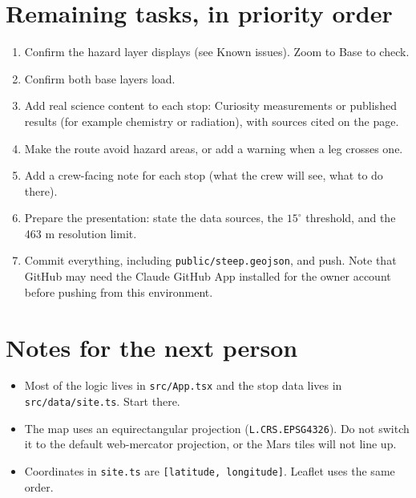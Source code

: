 \documentclass[11pt]{article}
\begin{document}
\section{Remaining tasks, in priority order}
\begin{enumerate}[leftmargin=*]
  \item Confirm the hazard layer displays (see Known issues). Zoom to Base to check.
  \item Confirm both base layers load.
  \item Add real science content to each stop: Curiosity measurements or published results (for example chemistry or radiation), with sources cited on the page.
  \item Make the route avoid hazard areas, or add a warning when a leg crosses one.
  \item Add a crew-facing note for each stop (what the crew will see, what to do there).
  \item Prepare the presentation: state the data sources, the $15^\circ$ threshold, and the 463 m resolution limit.
  \item Commit everything, including \texttt{public/steep.geojson}, and push. Note that GitHub may need the Claude GitHub App installed for the owner account before pushing from this environment.
\end{enumerate}

\section{Notes for the next person}
\begin{itemize}[leftmargin=*]
  \item Most of the logic lives in \texttt{src/App.tsx} and the stop data lives in \texttt{src/data/site.ts}. Start there.
  \item The map uses an equirectangular projection (\texttt{L.CRS.EPSG4326}). Do not switch it to the default web-mercator projection, or the Mars tiles will not line up.
  \item Coordinates in \texttt{site.ts} are \texttt{[latitude, longitude]}. Leaflet uses the same order.
\end{itemize}
\end{document}
